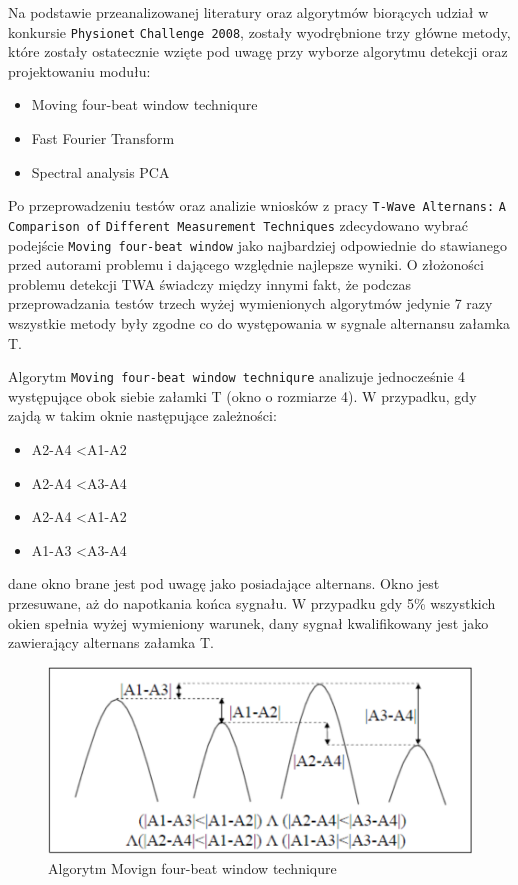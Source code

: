 \documentclass[a4paper, 11pt]{article}
\begin{document}
Na podstawie przeanalizowanej literatury oraz algorytmów biorących udział w konkursie \verb|Physionet|  \verb|Challenge 2008|, zostały wyodrębnione trzy główne metody, które zostały ostatecznie wzięte pod uwagę przy wyborze algorytmu detekcji oraz projektowaniu modułu:
\begin{itemize}
	\item Moving four-beat window techniqure
	\item Fast Fourier Transform
	\item Spectral analysis PCA
\end{itemize}

Po przeprowadzeniu testów oraz analizie wniosków z pracy  \verb|T-Wave Alternans:|  \verb|A Comparison of|  \verb|Different Measurement Techniques| zdecydowano wybrać podejście  \verb|Moving four-beat window| jako najbardziej odpowiednie do stawianego przed autorami problemu i dającego względnie najlepsze wyniki. O złożoności problemu detekcji TWA świadczy między innymi fakt, że podczas przeprowadzania testów trzech wyżej wymienionych algorytmów jedynie 7 razy wszystkie metody były zgodne co do występowania w sygnale alternansu załamka T. 

Algorytm \verb|Moving four-beat window techniqure| analizuje jednocześnie 4 występujące obok siebie załamki T (okno o rozmiarze 4). W przypadku, gdy zajdą w takim oknie następujące zależności: 
\begin{itemize}
	\item A2-A4 \textless A1-A2
	\item A2-A4 \textless A3-A4
	\item A2-A4 \textless A1-A2
	\item A1-A3 \textless A3-A4
\end{itemize}

dane okno brane jest pod uwagę jako posiadające alternans. Okno jest przesuwane, aż do napotkania końca sygnału. W przypadku gdy 5\% wszystkich okien spełnia wyżej wymieniony warunek, dany sygnał kwalifikowany jest jako zawierający alternans załamka T. 

\begin{center}
%
\begin{figure}
\begin{centering}
\includegraphics[scale=0.4]{include/twa_1}
\par\end{centering}

\caption{Algorytm Movign four-beat window techniqure}
\label{fig:twa_1}
\end{figure}

\par\end{center}
\end{document}
